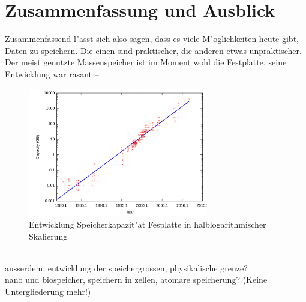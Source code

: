 
\chapter{Zusammenfassung und Ausblick}
\label{ch:Zusammenfassung}
Zusammenfassend l"asst sich also sagen, dass es viele M"oglichkeiten heute gibt, Daten zu speichern. Die einen sind praktischer, die anderen etwas unpraktischer.
Der meist genutzte Massenspeicher ist im Moment wohl die Festplatte, seine Entwicklung war rasant –
\begin{figure}[ht]
				\centering
				\includegraphics[width=0.7\textwidth]{images/kapazit} 
				\caption[Entwicklung Speicherkapazit"at Fesplatte in halblogarithmischer Skalierung \cite{fig:kapazit}]{Entwicklung Speicherkapazit"at Fesplatte in halblogarithmischer Skalierung}
				\label{fig:kapazit}
				\end{figure}
\\
ausserdem, entwicklung der speichergrossen, physikalische grenze?
\\
nano und biospeicher, speichern in zellen, atomare speicherung?
(Keine Untergliederung mehr!)

